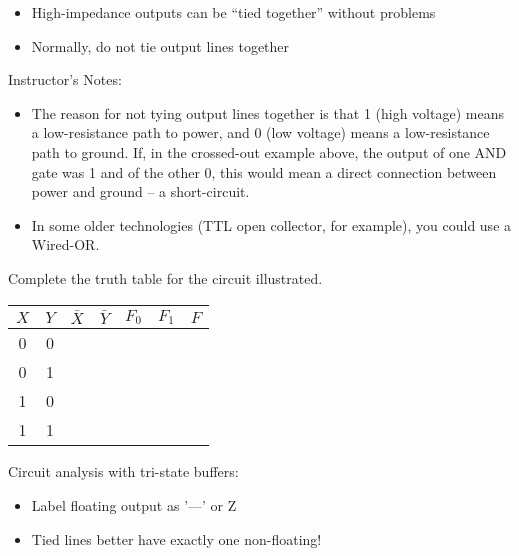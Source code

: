 \begin{frame}[fragile]
\begin{itemize}
\item High-impedance outputs can be ``tied together'' without problems
\item Normally, do not tie output lines together
\end{itemize}
\end{frame}

\BNotes\ifnum{}
\begin{frame}[fragile]
Instructor's Notes:
\begin{itemize}
\item The reason for not tying output lines together is that 1 (high
voltage) means a low-resistance path to power, and 0 (low voltage)
means a low-resistance path to ground. If, in the crossed-out example
above, the output of one AND gate was 1 and of the other 0, this would
mean a direct connection between power and ground -- a short-circuit.
\item In some older technologies (TTL open collector, for example), you
	could use a Wired-OR.
\end{itemize}
\end{frame}
\fi\ENotes

\begin{frame}[fragile]
\begin{tcolorbox}[enhanced,attach boxed title to top center={yshift=-3mm,yshifttext=-1mm},
  colback=red!5!white,colframe=red!75!black,colbacktitle=red!80!black,
  title=Try this,fonttitle=\bfseries,
  boxed title style={size=small,colframe=red!50!black} ]
\begin{multicols}{2}

    \columnbreak
    Complete the truth table for the circuit illustrated.
        \begin{center}
        \begin{tabular}{cc|cc|cc|c}
                $X$ & $Y$ & $\bar{X}$ & $\bar{Y}$ & $F_0$ & $F_1$ & $F$\\
                \hline
                0 & 0 &&&&&\\
                0 & 1 &&&&&\\
                1 & 0 &&&&&\\
                1 & 1 &&&&&
        \end{tabular}
        \end{center}             
\end{multicols}
\end{tcolorbox}
 
        Circuit analysis with tri-state buffers:
        \begin{itemize}
                \item Label floating output as '---' or Z
                \item Tied lines better have exactly one non-floating!
        \end{itemize}
\BNotes\ifnum{}
~
\fi\ENotes
\end{frame}


